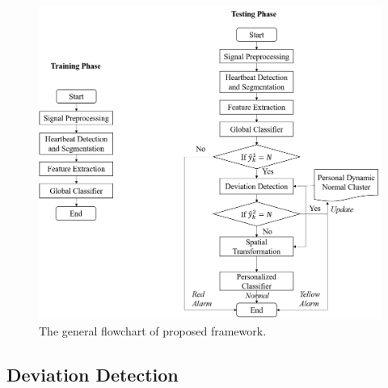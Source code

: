 \begin{figure}[ht]
	\centering
	\includegraphics[scale=.5]{Fig/flow2.png}
	\caption{The general flowchart of proposed framework.}
	\label{fig:flow}
\end{figure}


\subsection{Deviation Detection}

